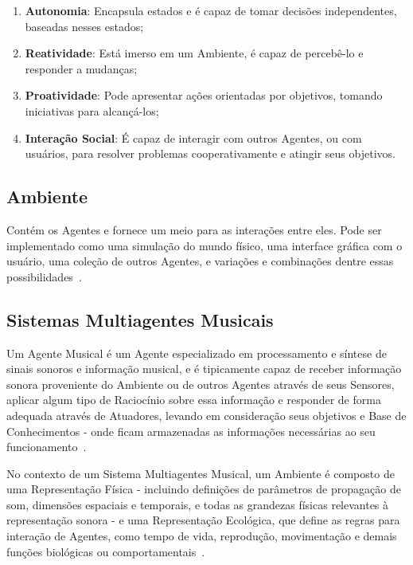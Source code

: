 \documentclass[a4paper, 11pt, twoside]{article}
\begin{document}
\begin{multicols}{2}
\begin{enumerate}
  \item \textbf{Autonomia}: Encapsula estados e é capaz de tomar decisões 
      independentes, baseadas nesses estados;
  \item \textbf{Reatividade}: Está imerso em um Ambiente, é capaz de percebê-lo
      e responder a mudanças;
  \item \textbf{Proatividade}: Pode apresentar ações orientadas por objetivos, 
      tomando iniciativas para alcançá-los;
  \item \textbf{Interação Social}: É capaz de interagir com outros Agentes, ou 
      com usuários, para resolver problemas cooperativamente e atingir 
      seus objetivos.
\end{enumerate}

\subsection{Ambiente}

Contém os Agentes e fornece um meio para as interações entre eles. Pode ser 
implementado como uma simulação do mundo físico, uma interface gráfica com o 
usuário, uma coleção de outros Agentes, e variações e combinações dentre essas 
possibilidades~\cite{wooldridgeART}.

\subsection{Sistemas Multiagentes Musicais}

Um Agente Musical é um Agente especializado em processamento e síntese de 
sinais sonoros e informação musical, e é tipicamente capaz de receber 
informação sonora proveniente do Ambiente ou de outros Agentes através de seus 
Sensores, aplicar algum tipo de Raciocínio sobre essa informação e responder 
de forma adequada através de Atuadores, levando em consideração seus objetivos 
e Base de Conhecimentos - onde ficam armazenadas as informações necessárias ao 
seu funcionamento~\cite{queiroz09, santiago12, leandro11}.

No contexto de um Sistema Multiagentes Musical, um Ambiente é 
composto de uma Representação Física - incluindo definições de parâmetros de 
propagação de som, dimensões espaciais e temporais, e todas as grandezas 
físicas relevantes à representação sonora - e uma Representação Ecológica, que 
define as regras para interação de Agentes, como tempo de vida, reprodução, 
movimentação e demais funções biológicas ou 
comportamentais~\cite{queiroz09, santiago12, leandro11}.

\end{multicols}
\end{document}
